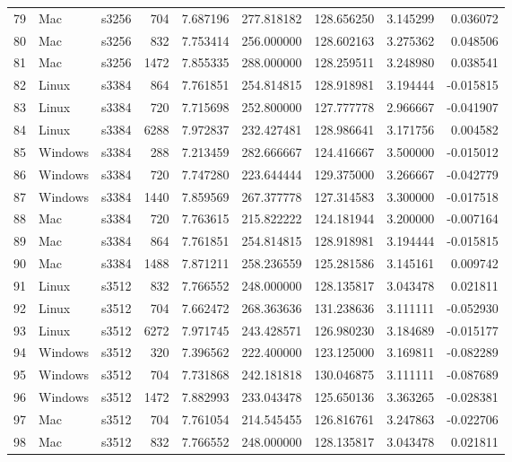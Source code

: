\documentclass{IEEEtran}
\begin{document}
\begin{longtable}{rllrrrrrr}
  79 & Mac & s3256 &     704 & 7.687196 & 277.818182 & 128.656250 & 3.145299 & 0.036072 \\ 
  80 & Mac & s3256 &     832 & 7.753414 & 256.000000 & 128.602163 & 3.275362 & 0.048506 \\ 
  81 & Mac & s3256 &    1472 & 7.855335 & 288.000000 & 128.259511 & 3.248980 & 0.038541 \\ 
  82 & Linux & s3384 &     864 & 7.761851 & 254.814815 & 128.918981 & 3.194444 & -0.015815 \\ 
  83 & Linux & s3384 &     720 & 7.715698 & 252.800000 & 127.777778 & 2.966667 & -0.041907 \\ 
  84 & Linux & s3384 &    6288 & 7.972837 & 232.427481 & 128.986641 & 3.171756 & 0.004582 \\ 
  85 & Windows & s3384 &     288 & 7.213459 & 282.666667 & 124.416667 & 3.500000 & -0.015012 \\ 
  86 & Windows & s3384 &     720 & 7.747280 & 223.644444 & 129.375000 & 3.266667 & -0.042779 \\ 
  87 & Windows & s3384 &    1440 & 7.859569 & 267.377778 & 127.314583 & 3.300000 & -0.017518 \\ 
  88 & Mac & s3384 &     720 & 7.763615 & 215.822222 & 124.181944 & 3.200000 & -0.007164 \\ 
  89 & Mac & s3384 &     864 & 7.761851 & 254.814815 & 128.918981 & 3.194444 & -0.015815 \\ 
  90 & Mac & s3384 &    1488 & 7.871211 & 258.236559 & 125.281586 & 3.145161 & 0.009742 \\ 
  91 & Linux & s3512 &     832 & 7.766552 & 248.000000 & 128.135817 & 3.043478 & 0.021811 \\ 
  92 & Linux & s3512 &     704 & 7.662472 & 268.363636 & 131.238636 & 3.111111 & -0.052930 \\ 
  93 & Linux & s3512 &    6272 & 7.971745 & 243.428571 & 126.980230 & 3.184689 & -0.015177 \\ 
  94 & Windows & s3512 &     320 & 7.396562 & 222.400000 & 123.125000 & 3.169811 & -0.082289 \\ 
  95 & Windows & s3512 &     704 & 7.731868 & 242.181818 & 130.046875 & 3.111111 & -0.087689 \\ 
  96 & Windows & s3512 &    1472 & 7.882993 & 233.043478 & 125.650136 & 3.363265 & -0.028381 \\ 
  97 & Mac & s3512 &     704 & 7.761054 & 214.545455 & 126.816761 & 3.247863 & -0.022706 \\ 
  98 & Mac & s3512 &     832 & 7.766552 & 248.000000 & 128.135817 & 3.043478 & 0.021811 \\ 

\end{longtable}
\end{document}
